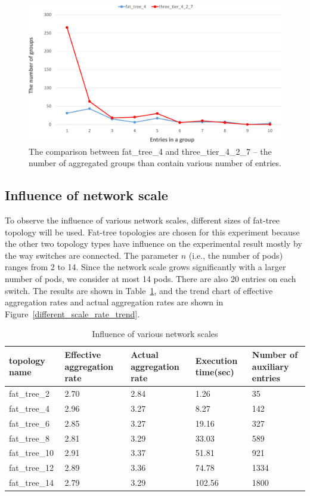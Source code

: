\documentclass[conference]{IEEEtran}
\begin{document}
\begin{figure}[ht]
\centering 
\includegraphics[width=1\linewidth]{figures/exp_topotype_distribute.pdf}
\caption{The comparison between fat\_tree\_4 and three\_tier\_4\_2\_7 -- the number of aggregated groups than contain various number of entries.}
\label{different_topo_distribute}
\end{figure}

\subsection{Influence of network scale}
To observe the influence of various network scales, different sizes of fat-tree topology will be used. Fat-tree topologies are chosen for this experiment because the other two topology types have influence on the experimental result mostly by the way switches are connected. The parameter $n$ (i.e., the number of pods) ranges from 2 to 14. Since the network scale grows significantly with a larger number of pods, we consider at most 14 pods. There are also 20 entries on each switch. The results are shown in Table~\ref{table:different_scale}, and the trend chart of effective aggregation rates and actual aggregation rates are shown in Figure~\ref{different_scale_rate_trend}.

\begin{table}
\centering
\caption{Influence of various network scales}
\begin{tabular}{|p{1.8cm}|p{1cm}|p{1.3cm}|p{1.1cm}|p{1.3cm}|}
\hline topology name & Effective aggregation rate & Actual aggregation rate & Execution time(sec) & Number of auxiliary entries \\
\hline
\hline fat\_tree\_2 & 2.70 & 2.84 & 1.26 & 35 \\
\hline fat\_tree\_4 & 2.96 & 3.27 & 8.27 & 142 \\
\hline fat\_tree\_6 & 2.85 & 3.27 & 19.16 & 327 \\
\hline fat\_tree\_8 & 2.81 & 3.29 & 33.03 & 589 \\
\hline fat\_tree\_10 & 2.91 & 3.37 & 51.81 & 921 \\
\hline fat\_tree\_12 & 2.89 & 3.36 & 74.78 & 1334 \\
\hline fat\_tree\_14 & 2.79 & 3.29 & 102.56 & 1800 \\
\hline
\end{tabular}
\label{table:different_scale}
\end{table}
\end{document}
